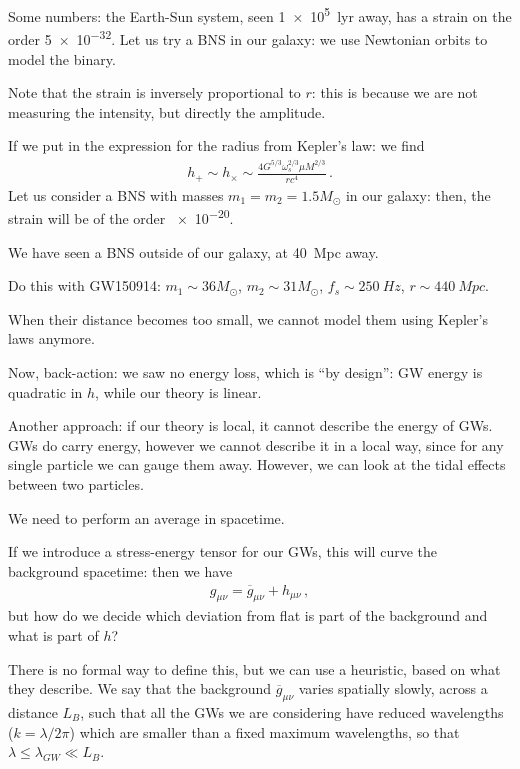 \documentclass[main.tex]{subfiles}
\begin{document}

Some numbers: the Earth-Sun system, seen \SI{1e5}{lyr} away, has a strain on the order \num{5e-32}. 
Let us try a BNS in our galaxy: we use Newtonian orbits to model the binary. 

Note that the strain is inversely proportional to \(r\): this is because we are not measuring the intensity, but directly the amplitude. 

If we put in the expression for the radius from Kepler's law: we find 
%
\begin{align}
h_{+} \sim h_{ \times } \sim \frac{4 G^{5/3} \omega_{s}^{2/3} \mu M^{2/3}}{r c^{4}}
\,.
\end{align}
%
Let us consider a BNS with masses \(m_1 = m_2 = 1.5 M_{\odot}\) in our galaxy: then, the strain will be  of the order \num{e-20}.

We have seen a BNS outside of our galaxy, at \SI{40}{Mpc} away. 

Do this with GW150914: \(m_1 \sim 36 M_{\odot}\), \(m_2 \sim 31 M_{\odot}\), \(f_s \sim \SI{250}{Hz}\), \(r \sim \SI{440}{Mpc}\).

When their distance becomes too small, we cannot model them using Kepler's laws anymore. 

Now, back-action: we saw no energy loss, which is ``by design'': GW energy is quadratic in \(h\), while our theory is linear. 

Another approach: if our theory is local, it cannot describe the energy of GWs. 
GWs do carry energy, however we cannot describe it in a local way, since for any single particle we can gauge them away. However, we can look at the tidal effects between two particles. 

We need to perform an average in spacetime. 

If we introduce a stress-energy tensor for our GWs, this will curve the background spacetime: then we have 
%
\begin{align}
g_{\mu \nu } = \overline{g}_{\mu \nu } + h_{\mu \nu }
\,,
\end{align}
%
but how do we decide which deviation from flat is part of the background and what is part of \(h\)?

There is no formal way to define this, but we can use a heuristic, based on what they describe. 
We say that the background \(\overline{g}_{\mu \nu }\) varies spatially slowly, across a distance \(L_B\), such that all the GWs we are considering have reduced wavelengths (\(k = \lambda /2 \pi \)) which are smaller than a fixed maximum wavelengths, so that \(\lambda  \leq \lambda_{GW} \ll L_B\). 
\end{document}
